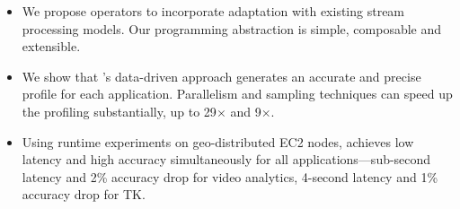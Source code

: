 \begin{itemize}[leftmargin=*, topsep=2pt, itemsep=2pt]

\item We propose \maybe{} operators to incorporate adaptation with existing
  stream processing models. Our programming abstraction is simple, composable
  and extensible.

\item We show that \sysname{}'s data-driven approach generates an accurate and
  precise profile for each application. Parallelism and sampling techniques
  can speed up the profiling substantially, up to 29$\times$ and 9$\times$\@.

\item Using runtime experiments on geo-distributed EC2 nodes, \sysname{}
  achieves low latency and high accuracy simultaneously for all
  applications---sub-second latency and 2\% accuracy drop for video analytics,
  4-second latency and 1\% accuracy drop for TK\@.

\end{itemize}


